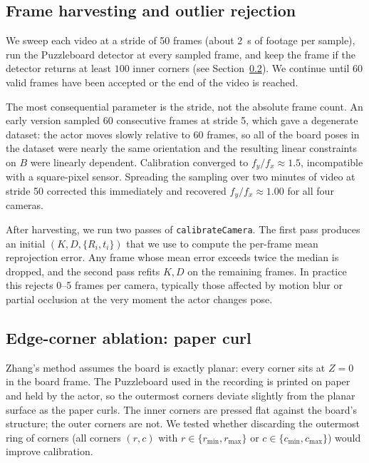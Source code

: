 \documentclass[twocolumn]{article}
\begin{document}
\subsection{Frame harvesting and outlier rejection}

We sweep each video at a stride of 50 frames (about 2~s of footage per
sample), run the Puzzleboard detector at every sampled frame, and
keep the frame if the detector returns at least $100$ inner corners
(see Section~\ref{sec:edge-ablation}). We continue until 60 valid
frames have been accepted or the end of the video is reached.

The most consequential parameter is the stride, not the absolute frame
count. An early version sampled 60 consecutive frames at stride 5, which
gave a degenerate dataset: the actor moves slowly relative to 60 frames,
so all of the board poses in the dataset were nearly the same
orientation and the resulting linear constraints on $B$ were linearly
dependent. Calibration converged to $f_y / f_x \approx 1.5$,
incompatible with a square-pixel sensor. Spreading the sampling over
two minutes of video at stride 50 corrected this immediately and
recovered $f_y / f_x \approx 1.00$ for all four cameras.

After harvesting, we run two passes of \texttt{calibrateCamera}. The
first pass produces an initial $(K, D, \{R_i, t_i\})$ that we use to
compute the per-frame mean reprojection error. Any frame whose mean
error exceeds twice the median is dropped, and the second pass refits
$K, D$ on the remaining frames. In practice this rejects 0--5 frames
per camera, typically those affected by motion blur or partial
occlusion at the very moment the actor changes pose.

\subsection{Edge-corner ablation: paper curl}
\label{sec:edge-ablation}

Zhang's method assumes the board is exactly planar: every corner sits
at $Z = 0$ in the board frame. The Puzzleboard used in the recording
is printed on paper and held by the actor, so the outermost corners
deviate slightly from the planar surface as the paper curls. The
inner corners are pressed flat against the board's structure; the
outer corners are not. We tested whether discarding the outermost
ring of corners (all corners $(r, c)$ with $r \in \{r_{\min},
r_{\max}\}$ or $c \in \{c_{\min}, c_{\max}\}$) would improve
calibration.
\end{document}

